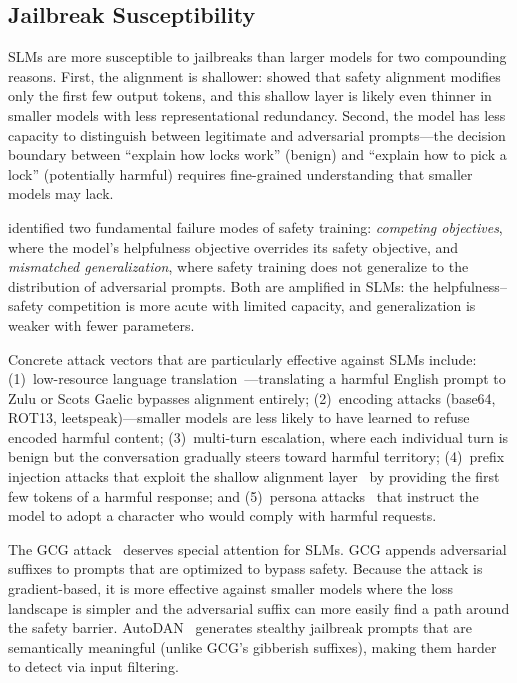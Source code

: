 \documentclass[12pt,a4paper]{article}
\begin{document}
\subsection{Jailbreak Susceptibility}

SLMs are more susceptible to jailbreaks than larger models for two compounding reasons. First, the alignment is shallower: \citet{qi2025shallow} showed that safety alignment modifies only the first few output tokens, and this shallow layer is likely even thinner in smaller models with less representational redundancy. Second, the model has less capacity to distinguish between legitimate and adversarial prompts---the decision boundary between ``explain how locks work'' (benign) and ``explain how to pick a lock'' (potentially harmful) requires fine-grained understanding that smaller models may lack.

\citet{wei2024jailbroken} identified two fundamental failure modes of safety training: \emph{competing objectives}, where the model's helpfulness objective overrides its safety objective, and \emph{mismatched generalization}, where safety training does not generalize to the distribution of adversarial prompts. Both are amplified in SLMs: the helpfulness--safety competition is more acute with limited capacity, and generalization is weaker with fewer parameters.

Concrete attack vectors that are particularly effective against SLMs include: (1)~low-resource language translation~\citep{deng2024multilingual}---translating a harmful English prompt to Zulu or Scots Gaelic bypasses alignment entirely; (2)~encoding attacks (base64, ROT13, leetspeak)---smaller models are less likely to have learned to refuse encoded harmful content; (3)~multi-turn escalation, where each individual turn is benign but the conversation gradually steers toward harmful territory; (4)~prefix injection attacks that exploit the shallow alignment layer~\citep{qi2025shallow} by providing the first few tokens of a harmful response; and (5)~persona attacks~\citep{perez2022ignore} that instruct the model to adopt a character who would comply with harmful requests.

The GCG attack~\citep{zou2023gcg} deserves special attention for SLMs. GCG appends adversarial suffixes to prompts that are optimized to bypass safety. Because the attack is gradient-based, it is more effective against smaller models where the loss landscape is simpler and the adversarial suffix can more easily find a path around the safety barrier. AutoDAN~\citep{liu2023autodan} generates stealthy jailbreak prompts that are semantically meaningful (unlike GCG's gibberish suffixes), making them harder to detect via input filtering.
\end{document}
